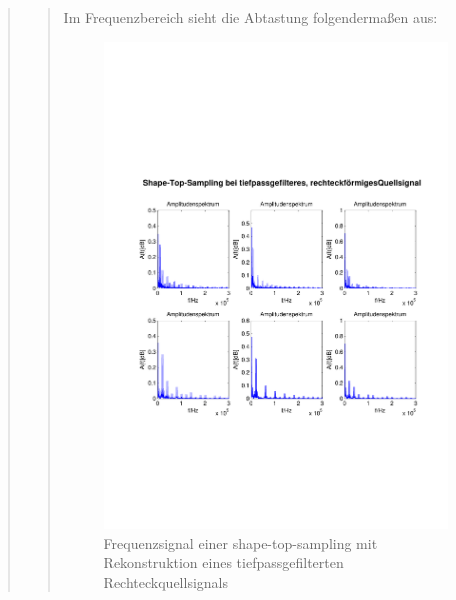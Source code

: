 \begin{quote}
\begin{quote}
        	Im Frequenzbereich sieht die Abtastung folgendermaßen aus:
        	
        	\begin{figure}[H]
            \centering
            \includegraphics[scale=0.6, trim = 1.5cm 6cm 1cm 8cm,
            clip]{./Bilder/shape-top-tp-recht_freq}
                \caption{Frequenzsignal einer shape-top-sampling mit Rekonstruktion
                eines tiefpassgefilterten Rechteckquellsignals}
      	    \end{figure}
        	
        
        \end{quote}  %
        

\end{quote}
